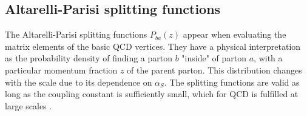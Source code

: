 \documentclass[main.tex]{subfiles}
\begin{document}
\subsection{Altarelli-Parisi splitting functions}\label{sec: derivation_splitting_functions_vacuum}
The Altarelli-Parisi splitting functions \(P_{ba}(z)\) appear when evaluating the matrix elements of the basic QCD vertices. They have a physical interpretation as the probability density of finding a parton \(b\) "inside" of parton \(a\), with a particular momentum fraction \(z\) of the parent parton. This distribution changes with the scale due to its dependence on \(\alpha_S\). The splitting functions are valid as long as the coupling constant is sufficiently small, which for QCD is fulfilled at large scales \cite{AltarelliParisi_original, ellis_stirling_webber_1996}.
\end{document}
